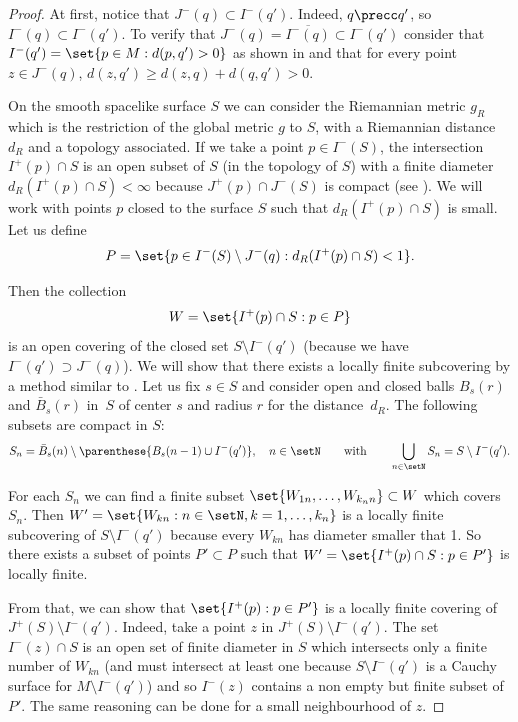 \begin{proof}
At f\/irst, notice that $J^-(q) \subset  I^-(q')$. Indeed, $q \precc q'$, so $I^-(q) \subset  I^-(q')$. To verify that $J^-(q) = \overline{I^-(q) }\subset  I^-(q')$ consider that $I^-(q') = \set{ p\in M : d(p,q') > 0}$ as shown in \cite{Beem} and that for every point $ z\in J^-(q)$, $d(z,q') \geq d(z,q) + d(q,q') > 0$.

On the smooth spacelike surface $S$ we can consider the Riemannian metric $g_R$ which is the restriction of the global metric $g$ to $S$, with a Riemannian distance $d_R$ and a topology associated. If we take a point $p \in I^-(S)$, the intersection $I^+(p) \cap S$ is an open subset of $S$ (in the topology of $S$) with a f\/inite diameter $d_R(I^+(p) \cap S) < \infty $  because $J^+(p) \cap J^-(S)$ is compact (see \cite{Wald}). We will work with points $p$ closed to the surface $S$ such that $d_R(I^+(p) \cap S)$ is small. Let us def\/ine
\[
P = \set{ p \in I^-(S) \setminus J^-(q) : d_R(I^+(p) \cap S) < 1}.
\]

Then the collection
\[
W = \set{ I^+(p) \cap S : p \in P}
\]
is an open covering of the closed set $S \setminus I^-(q')$ (because we have $I^-(q') \supset J^-(q)$). We will show that there exists a locally f\/inite subcovering by a method similar to \cite{BS03}. Let us f\/ix $s \in S$ and consider open and closed balls $B_s(r)$ and $\bar B_s(r)$ in~$S$ of center $s$ and radius $r$ for the distance~$d_R$. The following subsets are compact in $S$:
\[
S_n = \bar B_s(n) \setminus \parenthese{ B_s(n-1) \cup I^-(q')}, \quad n \in \setN \qquad \text{with} \qquad \bigcup_{n\in \setN} S_n = S \setminus I^-(q').
\]

For each $S_n$ we can f\/ind a f\/inite subset $\set{W_{1n}, \dots, W_{k_n n}} \subset W$ which covers $S_n$. Then $W' = \set{W_{kn} : n\in \setN , k = 1, \dots, k_n}$ is a locally f\/inite subcovering of $S \setminus I^-(q')$ because every $W_{kn}$ has diameter smaller that 1. So there exists a subset of points $P' \subset P$ such that $W' = \set{ I^+(p) \cap S : p \in P'}$ is locally f\/inite.

From that, we can show that $\set{I^+(p) : p \in P'}$ is a locally f\/inite covering of  $J^+(S) \setminus I^-(q')$. Indeed, take a point $z$ in $J^+(S) \setminus I^-(q')$. The set $I^-(z) \cap S$ is an open set of f\/inite diameter in $S$ which intersects only a f\/inite number of $W_{kn}$ (and must intersect at least one because $S \setminus I^-(q')$ is a Cauchy surface for $M \setminus I^-(q')$) and so $I^-(z)$ contains a non empty but f\/inite subset of $P'$. The same reasoning can be done for a small neighbourhood of $z$.


\end{proof}
